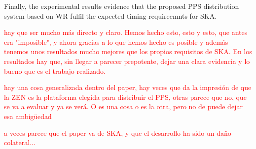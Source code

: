 Finally, the experimental results evidence that the proposed PPS distribution system based on WR fulfil the expected timing requireemnts for SKA.

\textcolor{red}{hay que ser mucho más directo y claro. Hemos hecho esto, esto y esto, que antes era "imposible", y ahora gracias a lo que hemos hecho es posible y además tenemos unos resultados mucho mejores que los propios requisitos de SKA. En los resultados hay que, sin llegar a parecer prepotente, dejar una clara evidencia y lo bueno que es el trabajo realizado.}

\textcolor{red}{hay una cosa generalizada dentro del paper, hay veces que da la impresión de que la ZEN es la plataforma elegida para distribuir el PPS, otras parece que no, que se va a evaluar y ya se verá. O es una cosa o es la otra, pero no de puede dejar esa ambigüedad}

\textcolor{red}{a veces parece que el paper va de SKA, y que el desarrollo ha sido un daño colateral...}



